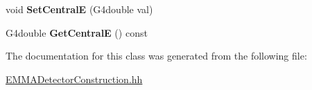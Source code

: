 \begin{DoxyCompactItemize}
\item 
\hypertarget{classEMMADetectorConstruction_ad12b32e6c40568ab4c53b23c5f6f2a33}{void {\bfseries Set\-Central\-E} (G4double val)}\label{classEMMADetectorConstruction_ad12b32e6c40568ab4c53b23c5f6f2a33}

\item 
\hypertarget{classEMMADetectorConstruction_af339acae41eb00db293badf67ede3229}{G4double {\bfseries Get\-Central\-E} () const }\label{classEMMADetectorConstruction_af339acae41eb00db293badf67ede3229}

\end{DoxyCompactItemize}


The documentation for this class was generated from the following file\-:\begin{DoxyCompactItemize}
\item 
\hyperlink{EMMADetectorConstruction_8hh}{E\-M\-M\-A\-Detector\-Construction.\-hh}\end{DoxyCompactItemize}

